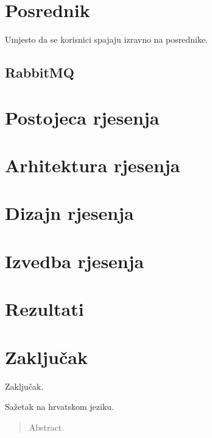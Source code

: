 \documentclass[times, utf8, diplomski, numeric]{fer}
\begin{document}
\chapter{Posrednik}
Umjesto da se korisnici spajaju izravno na posrednike.








\section{RabbitMQ}

\chapter{Postojeca rjesenja}

\chapter{Arhitektura rjesenja}

\chapter{Dizajn rjesenja}

\chapter{Izvedba rjesenja}

\chapter{Rezultati}

\chapter{Zaključak}
Zaključak.




\begin{sazetak}
Sažetak na hrvatskom jeziku.

\end{sazetak}

\begin{abstract}
Abstract.

\end{abstract}
\end{document}
